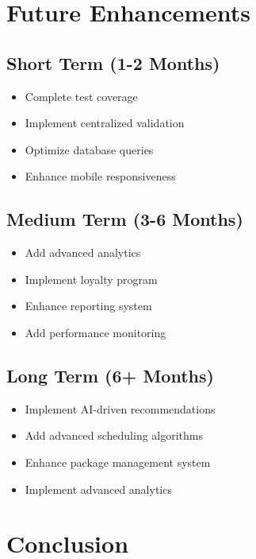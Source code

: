 \section{Future Enhancements}

\subsection{Short Term (1-2 Months)}
\begin{itemize}
    \item Complete test coverage
    \item Implement centralized validation
    \item Optimize database queries
    \item Enhance mobile responsiveness
\end{itemize}

\subsection{Medium Term (3-6 Months)}
\begin{itemize}
    \item Add advanced analytics
    \item Implement loyalty program
    \item Enhance reporting system
    \item Add performance monitoring
\end{itemize}

\subsection{Long Term (6+ Months)}
\begin{itemize}
    \item Implement AI-driven recommendations
    \item Add advanced scheduling algorithms
    \item Enhance package management system
    \item Implement advanced analytics
\end{itemize}

\section{Conclusion}

